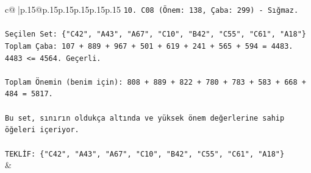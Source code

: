 \documentclass{article}
\begin{document}
{\begin{supertabular}{c@{$\;$}|p{.15\linewidth}@{}p{.15\linewidth}p{.15\linewidth}p{.15\linewidth}p{.15\linewidth}p{.15\linewidth}}
{{{\texttt{10. C08 (Önem: 138, Çaba: 299) {-} Sığmaz.} \\
\\ 
\texttt{Seçilen Set: \{"C42", "A43", "A67", "C10", "B42", "C55", "C61", "A18"\}} \\
\texttt{Toplam Çaba: 107 + 889 + 967 + 501 + 619 + 241 + 565 + 594 = 4483.} \\
\texttt{4483 <= 4564. Geçerli.} \\
\\ 
\texttt{Toplam Önemin (benim için): 808 + 889 + 822 + 780 + 783 + 583 + 668 + 484 = 5817.} \\
\\ 
\texttt{Bu set, sınırın oldukça altında ve yüksek önem değerlerine sahip öğeleri içeriyor.} \\
\\ 
\texttt{TEKLİF: \{"C42", "A43", "A67", "C10", "B42", "C55", "C61", "A18"\}} \\
            }
        }
    }
    & \\ \\


\end{supertabular}}
\end{document}
